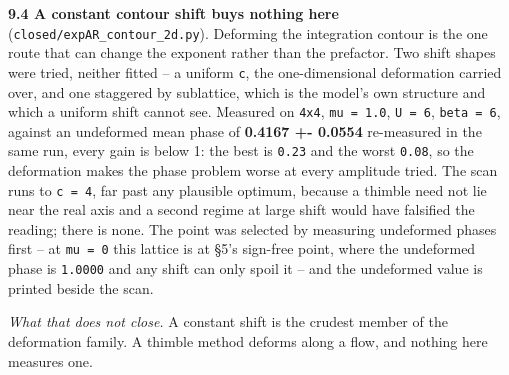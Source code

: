 \documentclass[10pt,letterpaper,twocolumn]{article}
\begin{document}
\textbf{9.4 A constant contour shift buys nothing here} (\texttt{closed/\allowbreak{}expAR\_\allowbreak{}contour\_\allowbreak{}2d.\allowbreak{}py}). Deforming the
integration contour is the one route that can change the exponent rather than the prefactor. Two
shift shapes were tried, neither fitted -- a uniform \texttt{c}, the one-dimensional deformation carried
over, and one staggered by sublattice, which is the model's own structure and which a uniform shift
cannot see. Measured on \texttt{4x4}, \texttt{mu\ =\allowbreak{}\ 1.\allowbreak{}0}, \texttt{U\ =\allowbreak{}\ 6}, \texttt{beta\ =\allowbreak{}\ 6}, against an undeformed mean phase of
\textbf{0.4167 +- 0.0554} re-measured in the same run, every gain is below 1: the best is \texttt{0.\allowbreak{}23} and the
worst \texttt{0.\allowbreak{}08}, so the deformation makes the phase problem worse at every amplitude tried. The scan
runs to \texttt{c\ =\allowbreak{}\ 4}, far past any plausible optimum, because a thimble need not lie near the real axis
and a second regime at large shift would have falsified the reading; there is none. The point was
selected by measuring undeformed phases first -- at \texttt{mu\ =\allowbreak{}\ 0} this lattice is at §5's sign-free
point, where the undeformed phase is \texttt{1.\allowbreak{}0000} and any shift can only spoil it -- and the undeformed
value is printed beside the scan.

\emph{What that does not close.} A constant shift is the crudest member of the deformation family. A
thimble method deforms along a flow, and nothing here measures one.
\end{document}
